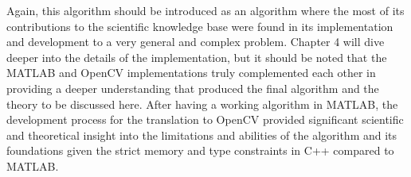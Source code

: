 Again, this algorithm should be introduced as an algorithm where the most of its contributions to the scientific knowledge base were found in its implementation and development to a very general and complex problem. Chapter 4 will dive deeper into the details of the implementation, but it should be noted that the MATLAB\textsuperscript{\textregistered} and OpenCV implementations truly complemented each other in providing a deeper understanding that produced the final algorithm and the theory to be discussed here. After having a working algorithm in MATLAB\textsuperscript{\textregistered}, the development process for the translation to OpenCV provided significant scientific and theoretical insight into the limitations and abilities of the algorithm and its foundations given the strict memory and type constraints in C++ compared to MATLAB\textsuperscript{\textregistered}.




